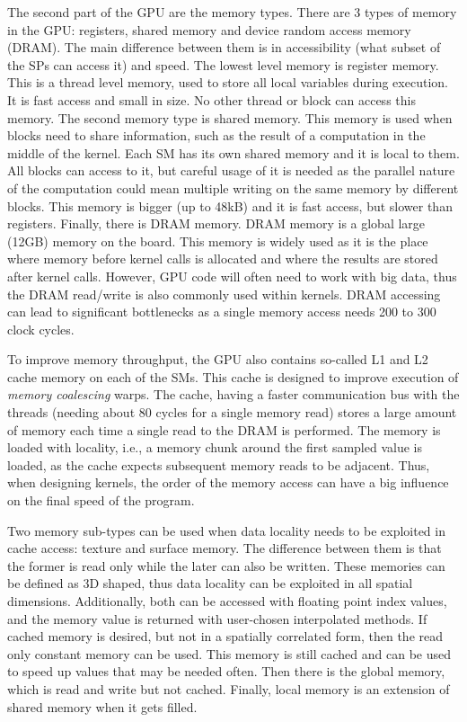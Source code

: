The second part of the GPU are the memory types. There are 3 types of memory in the GPU: registers, shared memory and device random access memory (DRAM). The main difference between them is in accessibility (what subset of the SPs can access it) and speed. The lowest level memory is register memory. This is a thread level memory, used to store all local variables during execution. It is fast access and small in size. No other thread or block can access this memory. The second memory type is shared memory. This memory is used when blocks need to share information, such as the result of a computation in the middle of the kernel. Each SM has its own shared memory and it is local to them. All blocks can access to it, but careful usage of it is needed as the parallel nature of the computation could mean multiple writing on the same memory by different blocks. This memory is bigger (up to 48kB) and it is fast access, but slower than registers. Finally, there is DRAM memory. DRAM memory is a global large (12GB) memory on the board. This memory is widely used as it is the place where memory before kernel calls is allocated and where the results are stored after kernel calls. However, GPU code will often need to work with big data, thus the DRAM read/write is also commonly used within kernels. DRAM accessing can lead to significant bottlenecks as a single memory access needs 200 to 300 clock cycles. 

To improve memory throughput, the GPU also contains so-called L1 and L2 cache memory on each of the SMs. This cache is designed to improve execution of \textit{memory coalescing} warps. The cache, having a faster communication bus with the threads (needing about 80 cycles for a single memory read) stores a large amount of memory each time a single read to the DRAM is performed. The memory is loaded with locality, i.e., a memory chunk around the first sampled value is loaded, as the cache expects subsequent memory reads to be adjacent. Thus, when designing kernels, the order of the memory access can have a big influence on the final speed of the program. 

Two memory sub-types can be used when data locality needs to be exploited in cache access: texture and surface memory. The difference between them is that the former is read only while the later can also be written. These memories can be defined as 3D shaped, thus data locality can be exploited in all spatial dimensions. Additionally, both can be accessed with floating point index values, and the memory value is returned with user-chosen interpolated methods. If cached memory is desired, but not in a spatially correlated form, then the read only constant memory can be used. This memory is still cached and can be used to speed up values that may be needed often. Then there is the global memory, which is read and write but not cached. Finally, local memory is an extension of shared memory when it gets filled.

